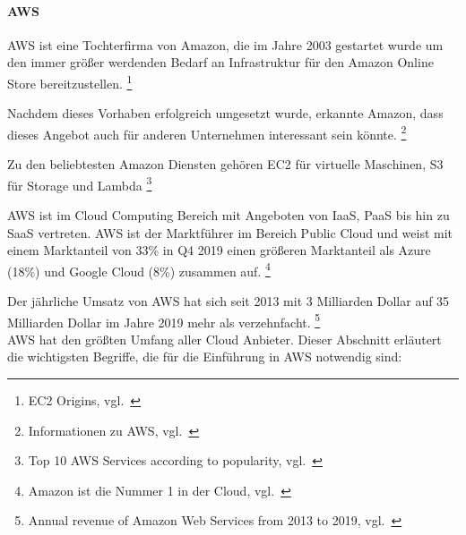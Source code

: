 \paragraph{AWS}\label{caas_tools_aws}

AWS ist eine Tochterfirma von Amazon, die im Jahre 2003 gestartet wurde um den immer größer werdenden Bedarf an Infrastruktur für den Amazon Online Store bereitzustellen.
\footnote{{EC2 Origins, vgl.~\cite{AWS_EC2_ORIGINS}}}

Nachdem dieses Vorhaben erfolgreich umgesetzt wurde, erkannte Amazon, dass dieses Angebot auch für anderen Unternehmen interessant sein könnte.
\footnote{{Informationen zu AWS, vgl.~\cite{AWS_ABOUT}}}

Zu den beliebtesten Amazon Diensten gehören EC2 für virtuelle Maschinen, S3 für Storage und Lambda
\footnote{{Top 10 AWS Services according to popularity, vgl.~\cite{AWS_MEDIUM_TOP10_SERVICES}}}

AWS ist im Cloud Computing Bereich mit Angeboten von IaaS, PaaS bis hin zu SaaS vertreten.
AWS ist der Marktführer im Bereich Public Cloud und weist mit einem Marktanteil von 33\% in Q4 2019 einen größeren Marktanteil als Azure (18\%) und Google Cloud (8\%) zusammen auf.
\footnote{{Amazon ist die Nummer 1 in der Cloud, vgl.~\cite{AWS_STATISTA}}}

Der jährliche Umsatz von AWS hat sich seit 2013 mit 3 Milliarden Dollar auf 35 Milliarden Dollar im Jahre 2019 mehr als verzehnfacht.
\footnote{{Annual revenue of Amazon Web Services from 2013 to 2019, vgl.~\cite{AWS_STATISTA_REVNUE}}} \\

AWS hat den größten Umfang aller Cloud Anbieter.
Dieser Abschnitt erläutert die wichtigsten Begriffe, die für die Einführung in AWS notwendig sind:

